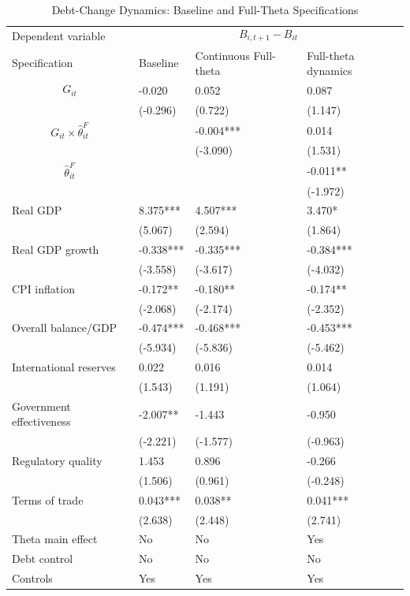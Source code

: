\begin{table}[H]\centering
\begin{threeparttable}
\caption{Debt-Change Dynamics: Baseline and Full-Theta Specifications}
\label{tab:debt_change_combined_fulltheta}
\scriptsize
\begin{tabularx}{\textwidth}{lYYY}
\toprule
Dependent variable &  \\
\cmidrule(lr){2-4}
Specification & Baseline & Continuous Full-theta & Full-theta dynamics \\
\midrule
$$G_{it}$$ & -0.020 & 0.052 & 0.087 \\
 & (-0.296) & (0.722) & (1.147) \\
$$G_{it}\times\widehat{\theta}^{F}_{it}$$ &  & -0.004*** & 0.014 \\
 &  & (-3.090) & (1.531) \\
$$\widehat{\theta}^{F}_{it}$$ &  &  & -0.011** \\
 &  &  & (-1.972) \\
Real GDP & 8.375*** & 4.507*** & 3.470* \\
 & (5.067) & (2.594) & (1.864) \\
Real GDP growth & -0.338*** & -0.335*** & -0.384*** \\
 & (-3.558) & (-3.617) & (-4.032) \\
CPI inflation & -0.172** & -0.180** & -0.174** \\
 & (-2.068) & (-2.174) & (-2.352) \\
Overall balance/GDP & -0.474*** & -0.468*** & -0.453*** \\
 & (-5.934) & (-5.836) & (-5.462) \\
International reserves & 0.022 & 0.016 & 0.014 \\
 & (1.543) & (1.191) & (1.064) \\
Government effectiveness & -2.007** & -1.443 & -0.950 \\
 & (-2.221) & (-1.577) & (-0.963) \\
Regulatory quality & 1.453 & 0.896 & -0.266 \\
 & (1.506) & (0.961) & (-0.248) \\
Terms of trade & 0.043*** & 0.038** & 0.041*** \\
 & (2.638) & (2.448) & (2.741) \\
\midrule
Theta main effect & No & No & Yes \\
Debt control & No & No & No \\
Controls & Yes & Yes & Yes \\

\end{tabularx}
\end{threeparttable}
\end{table}
